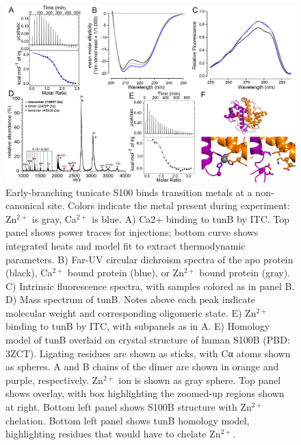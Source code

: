 \begin{figure}
\centering
	\includegraphics{ch3-fig5-smaller.png} 
\caption[Early-branching tunicate S100 binds transition metals at a non-canonical site]{Early-branching tunicate S100 binds transition metals at a non-canonical site. Colors indicate the metal present during experiment: Zn$^{2+}$ is gray, Ca$^{2+}$ is blue. A) Ca2+ binding to tunB by ITC. Top panel shows power traces for injections; bottom curve shows integrated heats and model fit to extract thermodynamic parameters. B) Far-UV circular dichroism spectra of the apo protein (black), Ca$^{2+}$ bound protein (blue), or Zn$^{2+}$ bound protein (gray). C) Intrinsic fluorescence spectra, with samples colored as in panel B. D) Mass spectrum of tunB. Notes above each peak indicate molecular weight and corresponding oligomeric state. E) Zn$^{2+}$ binding to tunB by ITC, with subpanels as in A. E) Homology model of tunB overlaid on crystal structure of human S100B (PBD: 3ZCT). Ligating residues are shown as sticks, with Cα atoms shown as spheres. A and B chains of the dimer are shown in orange and purple, respectively. Zn$^{2+}$ ion is shown as gray sphere. Top panel shows overlay, with box highlighting the zoomed-up regions shown at right. Bottom left panel shows S100B structure with Zn$^{2+}$ chelation. Bottom left panel shows tunB homology model, highlighting residues that would have to chelate Zn$^{2+}$.\label{samplefigure}}	
\end{figure}


